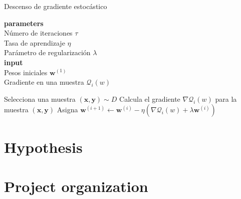 \begin{algorithm}[H]
    \caption{Descenso de gradiente estocástico}\label{alg:SGD}
    \hspace*{\algorithmicindent} \textbf{parameters} \\
    \hspace*{\algorithmicindent}\hspace*{\algorithmicindent} Número de iteraciones $\tau$ \\
    \hspace*{\algorithmicindent}\hspace*{\algorithmicindent} Tasa de aprendizaje $\eta$ \\
    \hspace*{\algorithmicindent}\hspace*{\algorithmicindent} Parámetro de regularización $\lambda$ \\
    \hspace*{\algorithmicindent} \textbf{input} \\
    \hspace*{\algorithmicindent}\hspace*{\algorithmicindent} Pesos iniciales $\mathbf{w}^{(1)}$ \\
    \hspace*{\algorithmicindent}\hspace*{\algorithmicindent} Gradiente en una muestra $\mathcal{Q}_i(w)$
    \begin{algorithmic}[1]
        \State Selecciona una muestra $(\mathbf{x}, \mathbf{y})\sim D$
        \State Calcula el gradiente $\nabla\mathcal{Q}_i(w)$ para la muestra $(\mathbf{x}, \mathbf{y})$
        \State Asigna $\mathbf{w}^{(i+1)} \gets \mathbf{w}^{(i)} - \eta(\nabla\mathcal{Q}_i(w) + \lambda\mathbf{w}^{(i)})$
        \EndFor
        \EndProcedure
    \end{algorithmic}
\end{algorithm}

\section{Hypothesis}
\lipsum[1-2]

\section{Project organization}
\lipsum[1-2]